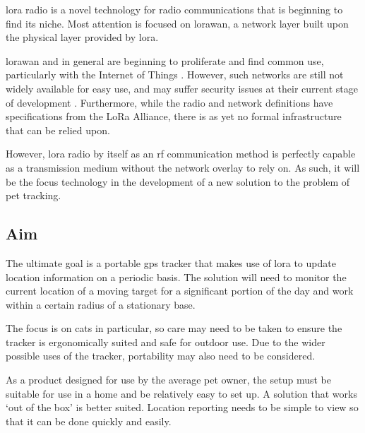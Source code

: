 \gls{lora} radio is a novel technology for radio communications
that is beginning to find its niche. Most attention is focused on \gls{lorawan},
a network layer built upon the physical layer provided by \gls{lora}.

\gls{lorawan} and  in general are beginning to proliferate and find common 
use, particularly with the Internet of Things \cite{bardyn2016}. 
However, such networks are still not widely available for easy use, and may 
suffer security issues at their current stage of development \cite{eldefrawy2019}. Furthermore, 
while the radio and network definitions have specifications from the LoRa Alliance,
there is as yet no formal infrastructure that can be relied upon. 

However, \gls{lora} radio by itself as an \acrshort{rf} communication method 
is perfectly capable as a transmission medium 
without the network overlay to rely on. As such, it will 
be the focus technology in the development of a new solution
to the problem of pet tracking. 

\subsection{Aim}
\label{sec:aim}
The ultimate goal is a portable \acrshort{gps} tracker that makes use of \gls{lora} to update location
 information on a periodic basis.
The solution will need to monitor the current location of a moving target for a 
significant portion of the day 
and work within a certain radius of a stationary base. 

The focus is on cats in particular, so care may need to be taken to 
ensure the tracker is ergonomically suited and safe for outdoor use.
Due to the wider possible uses of the tracker, portability may also need to be considered. 

As a product designed for use by the average pet owner, the setup must be suitable for use in a home
and be relatively easy to set up. A solution that works 
`out of the box' is better suited. Location reporting needs to be simple to view so that 
it can be done quickly and easily.  

